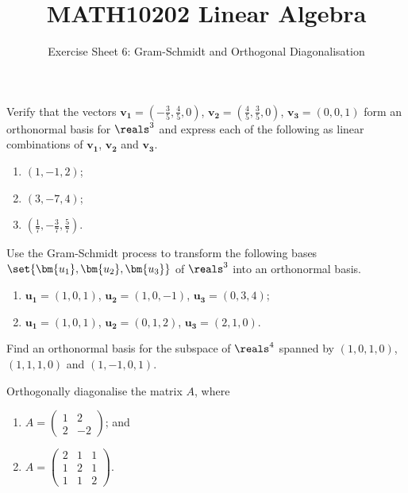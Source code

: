 \documentclass[english,12pt,a4paper]{scrartcl}
\title{MATH10202 Linear Algebra}
\subtitle{Exercise Sheet 6: Gram-Schmidt and Orthogonal Diagonalisation}
\author{}
\date{\vspace{-5ex}}
\renewcommand{\vec}[1]{\bm{#1}}
\newenvironment{modenumerate}
  {\enumerate\setupmodenumerate}
  {\endenumerate}
\newif\ifmoditem
\newcommand{\setupmodenumerate}{%
  \global\moditemfalse
  \let\origmakelabel\makelabel
  \def\moditem##1{\global\moditemtrue\def\mesymbol{##1}\item}%
  \def\makelabel##1{%
  \origmakelabel{##1\ifmoditem\rlap{\mesymbol}\fi\enspace}%
\global\moditemfalse}%
}
\begin{document}
\maketitle

\begin{modenumerate}
  \moditem{*} Verify that the vectors $\vec{v_1} = (-\frac{3}{5}, \frac{4}{5}, 
  0)$, $\vec{v_2} = (\frac{4}{5}, \frac{3}{5}, 0)$, $\vec{v_3} = (0, 0, 1)$ 
  form an orthonormal basis for $\reals^3$ and express each of the following as 
  linear combinations of $\vec{v_1}$, $\vec{v_2}$ and $\vec{v_3}$.
  \begin{multicols}{3}
    \begin{enumerate}
      \item $(1, -1, 2)$;
      \item $(3, -7, 4)$;
      \item $(\frac{1}{7}, -\frac{3}{7}, \frac{5}{7})$.
    \end{enumerate}
  \end{multicols}
  \moditem{*} Use the Gram-Schmidt process to transform the following bases 
  $\set{\vec{u_1}, \vec{u_2}, \vec{u_3}}$ of $\reals^3$ into an orthonormal 
  basis.
  \begin{enumerate}
    \item $\vec{u_1} = (1, 0, 1)$, $\vec{u_2} = (1, 0, -1)$, $\vec{u_3} = (0, 
      3, 4)$;
    \item $\vec{u_1} = (1, 0, 1)$, $\vec{u_2} = (0, 1, 2)$, $\vec{u_3} = (2, 1, 
      0)$.
  \end{enumerate}
  \item Find an orthonormal basis for the subspace of $\reals^4$ spanned by 
    $(1, 0, 1, 0)$, $(1, 1, 1, 0)$ and $(1, -1, 0, 1)$.
  \moditem{*} Orthogonally diagonalise the matrix $A$, where
  \begin{enumerate}
    \item $A =
      \begin{pmatrix}
        1 & 2 \\
        2 & -2
      \end{pmatrix}
      $; and
    \item $A =
      \begin{pmatrix}
        2 & 1 & 1 \\
        1 & 2 & 1 \\
        1 & 1 & 2
      \end{pmatrix}
      $.
  \end{enumerate}
\end{modenumerate}
\end{document}
